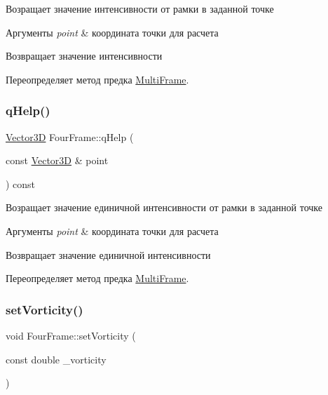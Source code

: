 Возращает значение интенсивности от рамки в заданной точке 
\begin{DoxyParams}{Аргументы}
{\em point} & координата точки для расчета \\
\hline
\end{DoxyParams}
\begin{DoxyReturn}{Возвращает}
значение интенсивности 
\end{DoxyReturn}


Переопределяет метод предка \mbox{\hyperlink{class_multi_frame_a7bc27f76622612b9ccef915c848e492d}{Multi\+Frame}}.

\mbox{\label{class_four_frame_aa6339751887314ff05ca479255b21432}} 
\subsubsection{\texorpdfstring{q\+Help()}{qHelp()}}
{\footnotesize\ttfamily \mbox{\hyperlink{class_vector3_d}{Vector3D}} Four\+Frame\+::q\+Help (\begin{DoxyParamCaption}\item[{const \mbox{\hyperlink{class_vector3_d}{Vector3D}} \&}]{point }\end{DoxyParamCaption}) const\hspace{0.3cm}{\ttfamily [virtual]}}

Возращает значение единичной интенсивности от рамки в заданной точке 
\begin{DoxyParams}{Аргументы}
{\em point} & координата точки для расчета \\
\hline
\end{DoxyParams}
\begin{DoxyReturn}{Возвращает}
значение единичной интенсивности 
\end{DoxyReturn}


Переопределяет метод предка \mbox{\hyperlink{class_multi_frame_a8da38b4d64ae762dfcb995911031ebf8}{Multi\+Frame}}.

\mbox{\label{class_four_frame_a14e84439f6615d56e5fbc32d438ea2d5}} 
\subsubsection{\texorpdfstring{set\+Vorticity()}{setVorticity()}}
{\footnotesize\ttfamily void Four\+Frame\+::set\+Vorticity (\begin{DoxyParamCaption}\item[{const double}]{\+\_\+vorticity }\end{DoxyParamCaption})\hspace{0.3cm}{\ttfamily [virtual]}}

